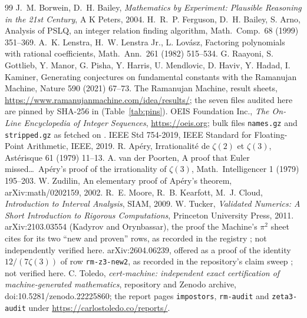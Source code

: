 \documentclass[11pt]{article}
\theoremstyle{definition}
\theoremstyle{plain}
\newcommand{\cf}[1]{\texttt{#1}}
\begin{document}
\begin{thebibliography}{99}\footnotesize\setlength{\itemsep}{0pt}
 J.~M. Borwein, D.~H. Bailey, \emph{Mathematics by Experiment: Plausible Reasoning in the 21st Century}, A K Peters, 2004.
 H.~R.~P. Ferguson, D.~H. Bailey, S. Arno, Analysis of PSLQ, an integer relation finding algorithm, Math.\ Comp.\ 68 (1999) 351--369.
 A.~K. Lenstra, H.~W. Lenstra Jr., L. Lov\'asz, Factoring polynomials with rational coefficients, Math.\ Ann.\ 261 (1982) 515--534.
 G. Raayoni, S. Gottlieb, Y. Manor, G. Pisha, Y. Harris, U. Mendlovic, D. Haviv, Y. Hadad, I. Kaminer, Generating conjectures on fundamental constants with the Ramanujan Machine, Nature 590 (2021) 67--73.
 The Ramanujan Machine, result sheets, \url{https://www.ramanujanmachine.com/idea/results/}; the seven files audited here are pinned by SHA-256 in \cite{repo} (Table~\ref{tab:pins}).
 OEIS Foundation Inc., \emph{The On-Line Encyclopedia of Integer Sequences}, \url{https://oeis.org}; bulk files \texttt{names.gz} and \texttt{stripped.gz} as fetched on \OeisPinned.
 IEEE Std 754-2019, IEEE Standard for Floating-Point Arithmetic, IEEE, 2019.
 R. Ap\'ery, Irrationalit\'e de $\zeta(2)$ et $\zeta(3)$, Ast\'erisque 61 (1979) 11--13.
 A. van der Poorten, A proof that Euler missed\ldots\ Ap\'ery's proof of the irrationality of $\zeta(3)$, Math.\ Intelligencer 1 (1979) 195--203.
 W. Zudilin, An elementary proof of Ap\'ery's theorem, arXiv:math/0202159, 2002.
 R.~E. Moore, R.~B. Kearfott, M.~J. Cloud, \emph{Introduction to Interval Analysis}, SIAM, 2009.
 W. Tucker, \emph{Validated Numerics: A Short Introduction to Rigorous Computations}, Princeton University Press, 2011.
 arXiv:2103.03554 (Kadyrov and Orynbassar), the proof the Machine's $\pi^2$ sheet cites for its two ``new and proven'' rows, as recorded in the registry \cite{repo}; not independently verified here.
 arXiv:2604.06239, offered as a proof of the identity $12/(7\zeta(3))$ of row \cf{rm-z3-new2}, as recorded in the repository's claim sweep \cite{repo}; not verified here.
 C. Toledo, \emph{cert-machine: independent exact certification of machine-generated mathematics}, repository and Zenodo archive, doi:10.5281/zenodo.22225860; the report pages \texttt{impostors}, \texttt{rm-audit} and \texttt{zeta3-audit} under \url{https://carlostoledo.co/reports/}.
\end{thebibliography}
\end{document}
